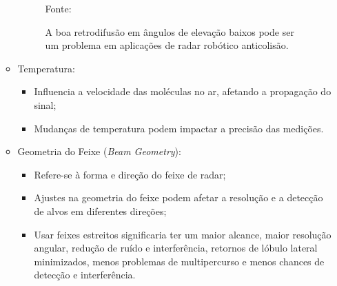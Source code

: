 \documentclass[xcolor=dvipsnames, aspectratio=169]{beamer}
\begin{document}
\begin{frame}
\begin{itemize}
\begin{itemize}
                \begin{figure}
                    \centering
                    {Fonte: \cite{everett1995sensors}}
                    \caption{A boa retrodifusão em ângulos de elevação baixos pode ser um problema em aplicações de radar robótico anticolisão.}
                    \label{fig:MMW_backscatter}
                \end{figure}

                \item Temperatura:
                \begin{itemize}
                    \item Influencia a velocidade das moléculas no ar, afetando a propagação do sinal;
                    \item Mudanças de temperatura podem impactar a precisão das medições.
                \end{itemize}
                \item Geometria do Feixe (\textit{Beam Geometry}):
                \begin{itemize}
                    \item Refere-se à forma e direção do feixe de radar;
                    \item Ajustes na geometria do feixe podem afetar a resolução e a detecção de alvos em diferentes direções;
                    \item Usar feixes estreitos significaria ter um maior alcance, maior resolução angular, redução de ruído e interferência, retornos de lóbulo lateral minimizados, menos problemas de multipercurso e menos chances de detecção e interferência.
                \end{itemize}
            \end{itemize} 
        \end{itemize}
    \end{frame}

\end{document}
